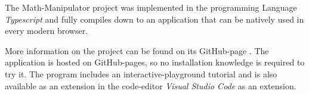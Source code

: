 The Math-Manipulator project was implemented in the programming Language \emph{Typescript} and fully compiles down to an application that can be natively used in every modern browser.

More information on the project can be found on its GitHub-page \cite{selfMathManipulator}.
The application is hosted on GitHub-pages, so no installation knowledge is required to try it. 
The program includes an interactive-playground tutorial and is also available as an extension in the code-editor \emph{Visual Studio Code} as an extension.